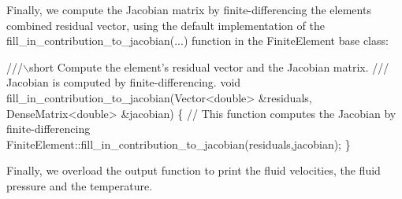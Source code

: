 Finally, we compute the Jacobian matrix by finite-\/differencing the element\textquotesingle{}s combined residual vector, using the default implementation of the {\ttfamily fill\+\_\+in\+\_\+contribution\+\_\+to\+\_\+jacobian}(...) function in the {\ttfamily Finite\+Element} base class\+:

 
\begin{DoxyCodeInclude}
 \textcolor{comment}{///\(\backslash\)short Compute the element's residual vector and the Jacobian matrix.}
\textcolor{comment}{ /// Jacobian is computed by finite-differencing.}
\textcolor{comment}{} \textcolor{keywordtype}{void} fill\_in\_contribution\_to\_jacobian(Vector<double> &residuals,
                                   DenseMatrix<double> &jacobian)
  \{
   \textcolor{comment}{// This function computes the Jacobian by finite-differencing}
   FiniteElement::fill\_in\_contribution\_to\_jacobian(residuals,jacobian);
  \}

\end{DoxyCodeInclude}


Finally, we overload the output function to print the fluid velocities, the fluid pressure and the temperature.

